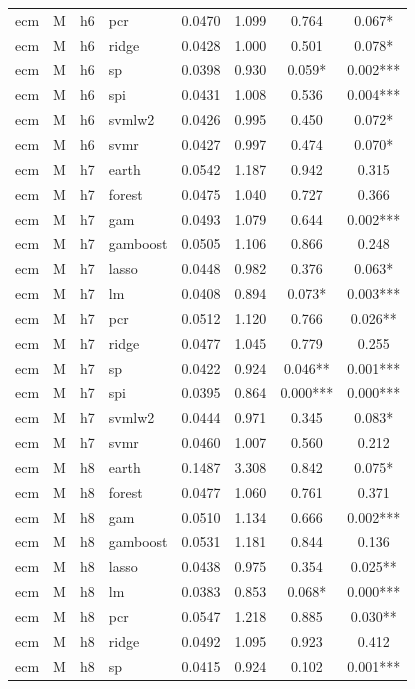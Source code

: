\begin{ThreePartTable}
\begin{longtable}[t]{llclcccc}
ecm & M & h6 & pcr & 0.0470 & 1.099 & 0.764 & 0.067*\\
ecm & M & h6 & ridge & 0.0428 & 1.000 & 0.501 & 0.078*\\
ecm & M & h6 & sp & 0.0398 & 0.930 & 0.059* & 0.002***\\
ecm & M & h6 & spi & 0.0431 & 1.008 & 0.536 & 0.004***\\
ecm & M & h6 & svmlw2 & 0.0426 & 0.995 & 0.450 & 0.072*\\
ecm & M & h6 & svmr & 0.0427 & 0.997 & 0.474 & 0.070*\\
\addlinespace
ecm & M & h7 & earth & 0.0542 & 1.187 & 0.942 & 0.315\\
ecm & M & h7 & forest & 0.0475 & 1.040 & 0.727 & 0.366\\
ecm & M & h7 & gam & 0.0493 & 1.079 & 0.644 & 0.002***\\
ecm & M & h7 & gamboost & 0.0505 & 1.106 & 0.866 & 0.248\\
ecm & M & h7 & lasso & 0.0448 & 0.982 & 0.376 & 0.063*\\
ecm & M & h7 & lm & 0.0408 & 0.894 & 0.073* & 0.003***\\
ecm & M & h7 & pcr & 0.0512 & 1.120 & 0.766 & 0.026**\\
ecm & M & h7 & ridge & 0.0477 & 1.045 & 0.779 & 0.255\\
ecm & M & h7 & sp & 0.0422 & 0.924 & 0.046** & 0.001***\\
ecm & M & h7 & spi & 0.0395 & 0.864 & 0.000*** & 0.000***\\
ecm & M & h7 & svmlw2 & 0.0444 & 0.971 & 0.345 & 0.083*\\
ecm & M & h7 & svmr & 0.0460 & 1.007 & 0.560 & 0.212\\
\addlinespace
ecm & M & h8 & earth & 0.1487 & 3.308 & 0.842 & 0.075*\\
ecm & M & h8 & forest & 0.0477 & 1.060 & 0.761 & 0.371\\
ecm & M & h8 & gam & 0.0510 & 1.134 & 0.666 & 0.002***\\
ecm & M & h8 & gamboost & 0.0531 & 1.181 & 0.844 & 0.136\\
ecm & M & h8 & lasso & 0.0438 & 0.975 & 0.354 & 0.025**\\
ecm & M & h8 & lm & 0.0383 & 0.853 & 0.068* & 0.000***\\
ecm & M & h8 & pcr & 0.0547 & 1.218 & 0.885 & 0.030**\\
ecm & M & h8 & ridge & 0.0492 & 1.095 & 0.923 & 0.412\\
ecm & M & h8 & sp & 0.0415 & 0.924 & 0.102 & 0.001***\\

\end{longtable}
\end{ThreePartTable}
